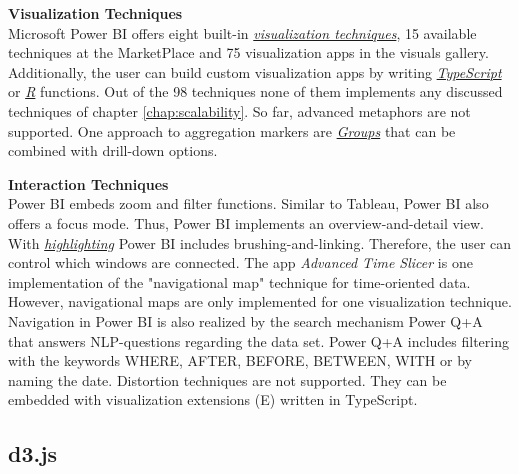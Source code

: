 \textbf{Visualization Techniques}\\
Microsoft Power BI offers eight built-in \href{https://powerbi.microsoft.com/en-us/documentation/powerbi-service-visualization-types-for-reports-and-q-and-a/}{\textit{visualization techniques}}, 15 available techniques at the MarketPlace and 75 visualization apps in the visuals gallery. Additionally, the user can build custom visualization apps by writing \href{https://powerbi.microsoft.com/en-us/documentation/powerbi-custom-visuals-getting-started-with-developer-tools/}{\textit{TypeScript}} or \href{https://powerbi.microsoft.com/en-us/guided-learning/powerbi-learning-3-11h-r-visual-integration/}{\textit{R}} functions. Out of the 98 techniques none of them implements any discussed techniques of chapter \ref{chap:scalability}. So far, advanced metaphors are not supported. One approach to aggregation markers are \hyperlink{https://Power BI.microsoft.com/de-de/blog/power-bi-desktop-october-feature-summary/\#grouping}{\textit{Groups}} that can be combined with drill-down options.
\par

\textbf{Interaction Techniques}\\
Power BI embeds zoom and filter functions. Similar to Tableau, Power BI also offers a focus mode. Thus, Power BI implements an overview-and-detail view. 
With \href{https://powerbi.microsoft.com/en-us/documentation/powerbi-service-about-filters-and-highlighting-in-reports/}{\textit{highlighting}} Power BI includes brushing-and-linking. Therefore, the user can control which windows are connected. The app \textit{Advanced Time Slicer} is one implementation of the "navigational map" technique for time-oriented data. However, navigational maps are only implemented for one visualization technique. Navigation in Power BI is also realized by the search mechanism Power \gls{Q+A} that answers \gls{NLP}-questions regarding the data set. Power  \gls{Q+A}  includes filtering with the keywords WHERE, AFTER, BEFORE, BETWEEN, WITH or by naming the date. Distortion techniques are not supported. They can be embedded with visualization extensions  (\gls{E}) written in TypeScript.

\pagebreak
\subsection{d3.js}\label{tool:d3.js}

